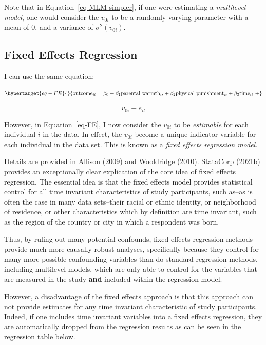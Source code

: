 \documentclass[
  letterpaper,
  DIV=11,
  numbers=noendperiod]{scrreprt}
\begin{document}
Note that in Equation~\ref{eq-MLM-simpler}, if one were estimating a
\emph{multilevel model}, one would consider the \(v_{0i}\) to be a
randomly varying parameter with a mean of 0, and a variance of
\(\sigma^2(v_{0i})\).

\hypertarget{fixed-effects-regression}{%
\subsection{Fixed Effects Regression}\label{fixed-effects-regression}}

I can use the same equation:

\begin{equation}\protect\hypertarget{eq-FE}{}{\text{outcome}_{it} = \beta_0 + \beta_1 \text{parental warmth}_{it} + \beta_2 \text{physical punishment}_{it} + \beta_3 \text{time}_{it} \ + }\label{eq-FE}\end{equation}

\[v_{0i} + e_{it}\]

However, in Equation~\ref{eq-FE}, I now consider the \(v_{0i}\) to be
\emph{estimable} for each individual \(i\) in the data. In effect, the
\(v_{0i}\) become a unique indicator variable for each individual in the
data set. This is known as a \emph{fixed effects regression model}.

Details are provided in Allison (2009) and Wooldridge (2010). StataCorp
(2021b) provides an exceptionally clear explication of the core idea of
fixed effects regression. The essential idea is that the fixed effects
model provides statistical control for all time invariant
characteristics of study participants, such as--as is often the case in
many data sets--their racial or ethnic identity, or neighborhood of
residence, or other characteristics which by definition are time
invariant, such as the region of the country or city in which a
respondent was born.

Thus, by ruling out many potential confounds, fixed effects regression
methods provide much more causally robust analyses, specifically because
they control for many more possible confounding variables than do
standard regression methods, including multilevel models, which are only
able to control for the variables that are measured in the study
\textbf{and} included within the regression model.

However, a disadvantage of the fixed effects approach is that this
approach can not provide estimates for any time invariant characteristic
of study participants. Indeed, if one includes time invariant variables
into a fixed effects regression, they are automatically dropped from the
regression results as can be seen in the regression table below.
\end{document}
